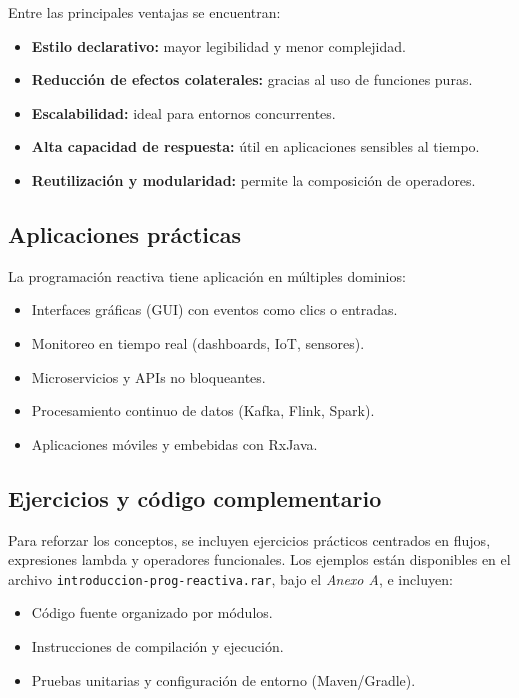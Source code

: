 Entre las principales ventajas se encuentran:

\begin{itemize}
    \item \textbf{Estilo declarativo:} mayor legibilidad y menor complejidad.
    \item \textbf{Reducción de efectos colaterales:} gracias al uso de funciones puras.
    \item \textbf{Escalabilidad:} ideal para entornos concurrentes.
    \item \textbf{Alta capacidad de respuesta:} útil en aplicaciones sensibles al tiempo.
    \item \textbf{Reutilización y modularidad:} permite la composición de operadores.
\end{itemize}

\subsection{Aplicaciones prácticas}

La programación reactiva tiene aplicación en múltiples dominios:

\begin{itemize}
    \item Interfaces gráficas (GUI) con eventos como clics o entradas.
    \item Monitoreo en tiempo real (dashboards, IoT, sensores).
    \item Microservicios y APIs no bloqueantes.
    \item Procesamiento continuo de datos (Kafka, Flink, Spark).
    \item Aplicaciones móviles y embebidas con RxJava.
\end{itemize}

\subsection{Ejercicios y código complementario}

Para reforzar los conceptos, se incluyen ejercicios prácticos centrados en flujos, expresiones lambda y operadores funcionales. Los ejemplos están disponibles en el archivo \texttt{introduccion-prog-reactiva.rar}, bajo el \textit{Anexo A}, e incluyen:

\begin{itemize}
    \item Código fuente organizado por módulos.
    \item Instrucciones de compilación y ejecución.
    \item Pruebas unitarias y configuración de entorno (Maven/Gradle).
\end{itemize}

